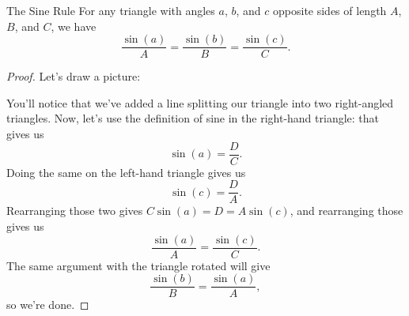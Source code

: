 \begin{theoremwname}{The Sine Rule}\label{sinerule}
	For any triangle with angles $a$, $b$, and $c$ opposite sides of length $A$, $B$, and $C$, we have \[\dfrac{\sin(a)}{A} = \dfrac{\sin(b)}{B} = \dfrac{\sin(c)}{C}.\]
\end{theoremwname}
\begin{proof}
	Let's draw a picture:
	
	
	You'll notice that we've added a line splitting our triangle into two right-angled triangles. Now, let's use the definition of sine in the right-hand triangle: that gives us \[\sin(a) = \dfrac{D}{C}.\] Doing the same on the left-hand triangle gives us \[\sin(c) = \dfrac{D}{A}.\] Rearranging those two gives $C\sin(a) = D = A\sin(c)$, and rearranging those gives us \[\dfrac{\sin(a)}{A} = \dfrac{\sin(c)}{C}.\] The same argument with the triangle rotated will give \[\dfrac{\sin(b)}{B} = \dfrac{\sin(a)}{A},\] so we're done.
\end{proof}